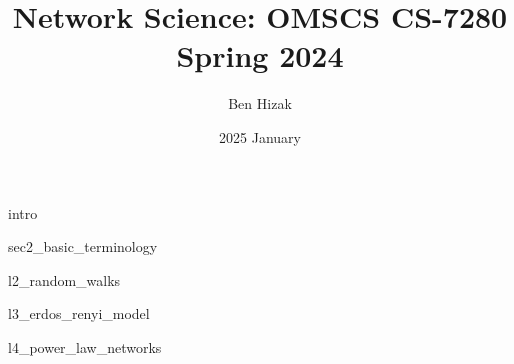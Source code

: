 \documentclass{article}
\title{Network Science: OMSCS CS-7280 Spring 2024}
\author{Ben Hizak}
\date{2025 January}
\begin{document}
\maketitle
{intro}
\newpage

{sec2_basic_terminology}
\newpage

{l2_random_walks}
\newpage

{l3_erdos_renyi_model}
\newpage

{l4_power_law_networks}
\newpage
\end{document}
